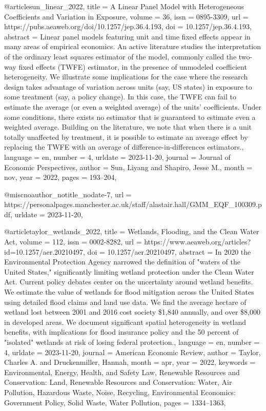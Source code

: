 {{{@article{sun_linear_2022,
	title = {A {Linear} {Panel} {Model} with {Heterogeneous} {Coefficients} and {Variation} in {Exposure}},
	volume = {36},
	issn = {0895-3309},
	url = {https://pubs.aeaweb.org/doi/10.1257/jep.36.4.193},
	doi = {10.1257/jep.36.4.193},
	abstract = {Linear panel models featuring unit and time fixed effects appear in many areas of empirical economics. An active literature studies the interpretation of the ordinary least squares estimator of the model, commonly called the two-way fixed effects (TWFE) estimator, in the presence of unmodeled coefficient heterogeneity. We illustrate some implications for the case where the research design takes advantage of variation across units (say, US states) in exposure to some treatment (say, a policy change). In this case, the TWFE can fail to estimate the average (or even a weighted average) of the units’ coefficients. Under some conditions, there exists no estimator that is guaranteed to estimate even a weighted average. Building on the literature, we note that when there is a unit totally unaffected by treatment, it is possible to estimate an average effect by replacing the TWFE with an average of difference-in-differences estimators.},
	language = {en},
	number = {4},
	urldate = {2023-11-20},
	journal = {Journal of Economic Perspectives},
	author = {Sun, Liyang and Shapiro, Jesse M.},
	month = nov,
	year = {2022},
	pages = {193--204},
}

@misc{noauthor_notitle_nodate-7,
	url = {https://personalpages.manchester.ac.uk/staff/alastair.hall/GMM_EQF_100309.pdf},
	urldate = {2023-11-20},
}

@article{taylor_wetlands_2022,
	title = {Wetlands, {Flooding}, and the {Clean} {Water} {Act}},
	volume = {112},
	issn = {0002-8282},
	url = {https://www.aeaweb.org/articles?id=10.1257/aer.20210497},
	doi = {10.1257/aer.20210497},
	abstract = {In 2020 the Environmental Protection Agency narrowed the definition of "waters of the United States," significantly limiting wetland protection under the Clean Water Act. Current policy debates center on the uncertainty around wetland benefits. We estimate the value of wetlands for flood mitigation across the United States using detailed flood claims and land use data. We find the average hectare of wetland lost between 2001 and 2016 cost society \$1,840 annually, and over \$8,000 in developed areas. We document significant spatial heterogeneity in wetland benefits, with implications for flood insurance policy and the 50 percent of "isolated" wetlands at risk of losing federal protection.},
	language = {en},
	number = {4},
	urldate = {2023-11-20},
	journal = {American Economic Review},
	author = {Taylor, Charles A. and Druckenmiller, Hannah},
	month = apr,
	year = {2022},
	keywords = {Environmental, Energy, Health, and Safety Law, Renewable Resources and Conservation: Land, Renewable Resources and Conservation: Water, Air Pollution, Hazardous Waste, Noise, Recycling, Environmental Economics: Government Policy, Solid Waste, Water Pollution},
	pages = {1334--1363},
}

}}}
